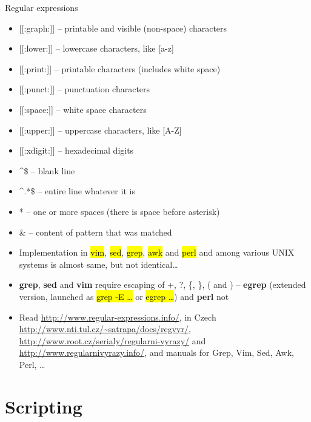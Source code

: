 \documentclass[compress, ucs, xelatex, 11pt, xcolor=svgnames,
  hyperref={
    bookmarks=true,
    unicode=true,
    colorlinks=true,
    pdftitle={Linux, command line and MetaCentrum},
    plainpages=false,
    pdfauthor={Vojtech Zeisek},
    pdfsubject={Course about use of Linux command line, writing shell scripts and using MetaCentrum of CESNET},
    pdfcreator={XeLaTeX},
    pdfkeywords={Linux, GNU, BASH, shell, command line, MetaCentrum},
    linkcolor=Red,
    anchorcolor=Blue,
    citecolor=Purple,
    filecolor=DodgerBlue,
    menucolor=DarkOrchid,
    urlcolor=DeepSkyBlue,
    pdftex},
  url={hyphens, lowtilde} %
  ]{beamer}
\renewcommand{\texttt}[1]{\hl{\ttfamily #1}}
\begin{document}
\begin{frame}[allowframebreaks]{Regular expressions}
\begin{itemize}
  \item \alert{[[:graph:]]} -- printable and visible (non-space) characters
  \item \alert{[[:lower:]]} -- lowercase characters, like \alert{[a-z]}
  \item \alert{[[:print:]]} -- printable characters (includes white space)
  \item \alert{[[:punct:]]} -- punctuation characters
  \item \alert{[[:space:]]} -- white space characters
  \item \alert{[[:upper:]]} -- uppercase characters, like \alert{[A-Z]}
  \item \alert{[[:xdigit:]]} -- hexadecimal digits
  \item \alert{\textasciicircum\$} -- blank line
  \item \alert{\textasciicircum.*\$} -- entire line whatever it is
  \item \alert{ *} -- one or more spaces (there is space before asterisk)
  \item \alert{\&} -- content of pattern that was matched
  \item Implementation in \texttt{vim}, \texttt{sed}, \texttt{grep}, \texttt{awk} and \texttt{perl} and among various UNIX systems is almost same, but not identical\ldots
  \item \textbf{grep}, \textbf{sed} and \textbf{vim} require escaping of \alert{+}, \alert{?}, \alert{\{}, \alert{\}}, \alert{(} and \alert{)} -- \textbf{egrep} (extended version, launched as \texttt{grep -E \ldots} or \texttt{egrep \ldots}) and \textbf{perl} not
  \item Read \url{http://www.regular-expressions.info/}, in Czech \url{http://www.nti.tul.cz/~satrapa/docs/regvyr/}, \url{http://www.root.cz/serialy/regularni-vyrazy/} and \url{http://www.regularnivyrazy.info/}, and manuals for Grep, Vim, Sed, Awk, Perl, \ldots
\end{itemize}
\end{frame}

\section{Scripting}
\end{document}
